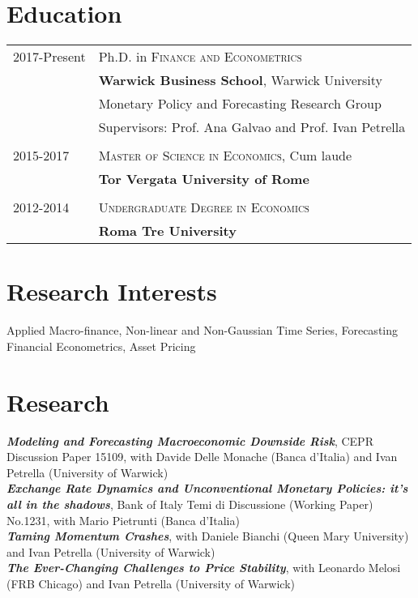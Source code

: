 \documentclass[a4paper,12pt]{article}
\begin{document}
\section{Education}
\begin{tabular}{ll}	
2017-Present & Ph.D. in \textsc{Finance and Econometrics}\\
&\textbf{Warwick Business School}, Warwick University\\
&Monetary Policy and Forecasting Research Group\\
&Supervisors: Prof. Ana Galvao and Prof. Ivan Petrella\\&\\
2015-2017 & \textsc{Master of Science in Economics}, Cum laude\\
&\textbf{Tor Vergata University of Rome}\\
&\\
2012-2014& \textsc{Undergraduate Degree in Economics}\\ 
&\textbf{Roma Tre University}\\
\end{tabular}

\section{Research Interests}
Applied Macro-finance, Non-linear and Non-Gaussian Time Series, Forecasting\\[.5em]
Financial Econometrics, Asset Pricing

\section{Research}
\textit{\textbf{Modeling and Forecasting Macroeconomic Downside Risk}}, CEPR Discussion Paper 15109, with Davide Delle Monache (Banca d'Italia) and Ivan Petrella (University of Warwick)\\[.5em]
\textit{\textbf{Exchange Rate Dynamics and Unconventional Monetary Policies: it’s all in the shadows}}, Bank of Italy Temi di Discussione (Working Paper) No.1231, with Mario Pietrunti (Banca d'Italia)\\[.5em]
\textit{\textbf{Taming Momentum Crashes}}, with Daniele Bianchi (Queen Mary University) and Ivan Petrella (University of Warwick)\\[.5em]
\textit{\textbf{The Ever-Changing Challenges to Price Stability}}, with Leonardo Melosi (FRB Chicago) and Ivan Petrella (University of Warwick)
\end{document}

